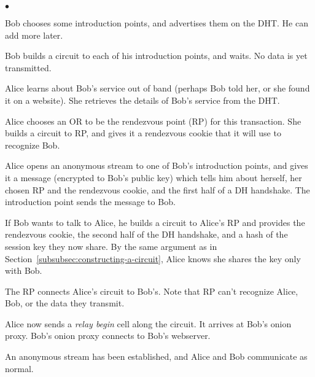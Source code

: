 \documentclass[times,10pt,twocolumn]{article}
\newenvironment{tightlist}{\begin{list}{$\bullet$}{
  \setlength{\itemsep}{0mm}
    \setlength{\parsep}{0mm}
    }}{\end{list}}
\begin{document}
\begin{tightlist}
\item Bob chooses some introduction points, and advertises them on
      the DHT.  He can add more later.
\item Bob builds a circuit to each of his introduction points,
      and waits.  No data is yet transmitted.
\item Alice learns about Bob's service out of band (perhaps Bob told her,
      or she found it on a website). She retrieves the details of Bob's
      service from the DHT.
\item Alice chooses an OR to be the rendezvous point (RP) for this
      transaction. She builds a circuit to RP, and gives it a
      rendezvous cookie that it will use to recognize Bob.
\item Alice opens an anonymous stream to one of Bob's introduction
      points, and gives it a message (encrypted to Bob's public key)
      which tells him 
      about herself, her chosen RP and the rendezvous cookie, and the
      first half of a DH
      handshake. The introduction point sends the message to Bob.
\item If Bob wants to talk to Alice, he builds a circuit to Alice's
      RP and provides the rendezvous cookie, the second half of the DH
      handshake, and a hash of the session
      key they now share. By the same argument as in
      Section~\ref{subsubsec:constructing-a-circuit}, Alice knows she
      shares the key only with Bob.
\item The RP connects Alice's circuit to Bob's. Note that RP can't
      recognize Alice, Bob, or the data they transmit.
\item Alice now sends a \emph{relay begin} cell along the circuit. It
      arrives at Bob's onion proxy. Bob's onion proxy connects to Bob's
      webserver.
\item An anonymous stream has been established, and Alice and Bob
      communicate as normal.
\end{tightlist}
\end{document}
